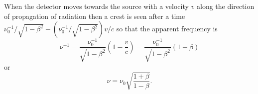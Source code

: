When the detector moves towards the source with a velocity $v$ along the 
direction of propagation of radiation then a crest is seen after a time 
$\nu_0^{-1}/\sqrt{1 - \beta^2} - (\nu_0^{-1}/\sqrt{1 - \beta^2})v/c$ so that the 
apparent frequency is
\[
\nu^{-1} = \frac{\nu_0^{-1}}{\sqrt{1 - \beta^2}}\left(1 - \frac{v}{c}\right) = 
\frac{\nu_0^{-1}}{\sqrt{1 - \beta^2}}(1 - \beta)
\]
or
\begin{equation}\label{c1s2e16}
\nu = \nu_0\sqrt{\frac{1 + \beta}{1 - \beta}}.
\end{equation}